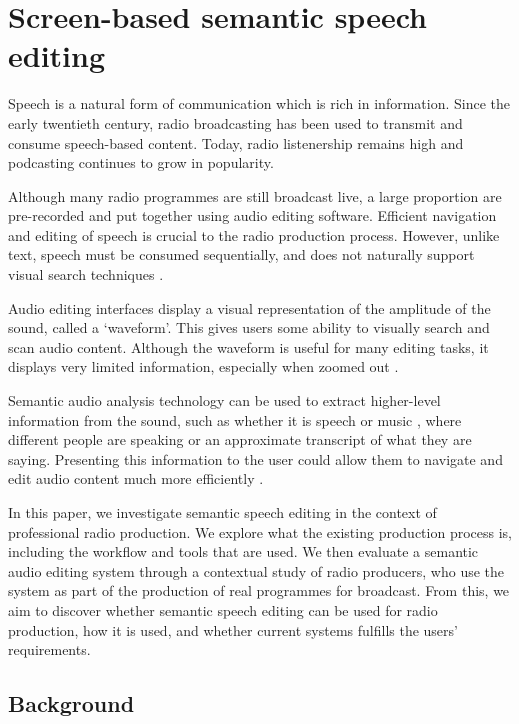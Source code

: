 \chapter{Screen-based semantic speech editing}\label{chp:screen}

Speech is a natural form of communication which is rich in information. Since
the early twentieth century, radio broadcasting has been used to transmit and
consume speech-based content. Today, radio listenership remains high and
podcasting continues to grow in popularity. 

Although many radio programmes are still broadcast live, a large proportion are
pre-recorded and put together using audio editing software. Efficient
navigation and editing of speech is crucial to the radio production process.
However, unlike text, speech must be consumed sequentially, and does not
naturally support visual search techniques \citep{Wolfe2004}. 

Audio editing interfaces display a visual representation of the amplitude of
the sound, called a `waveform'. This gives users some ability to visually
search and scan audio content. Although the waveform is useful for many editing
tasks, it displays very limited information, especially when zoomed out
\citep{Loviscach2011}.

Semantic audio analysis technology can be used to extract higher-level
information from the sound, such as whether it is speech or music
\citep{Panagiotakis2005}, where different people are speaking
\citep{AngueraMiro2012} or an approximate transcript of what they are saying.
Presenting this information to the user could allow them to navigate and edit
audio content much more efficiently \citep{Whittaker2004}.

In this paper, we investigate semantic speech editing in the context of professional radio production. We explore what
the existing production process is, including the workflow and tools that are used.  We then evaluate a semantic audio
editing system through a contextual study of radio producers, who use the system as part of the production of real
programmes for broadcast. From this, we aim to discover whether semantic speech editing can be used for radio
production, how it is used, and whether current systems fulfills the users' requirements.


\section{Background}\label{sec:relatedwork}

